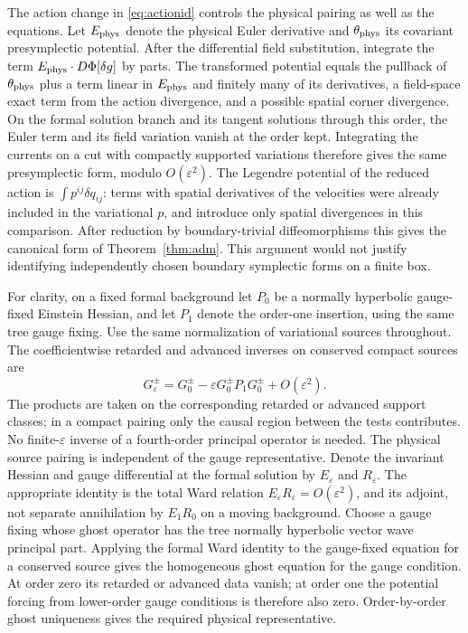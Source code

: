 \documentclass[11pt]{article}
\newcommand{\eps}{\varepsilon}
\begin{document}
The action change in \eqref{eq:actionid} controls the physical pairing as well as the equations. Let \(E_{\rm phys}\) denote the physical Euler derivative and \(\theta_{\rm phys}\) its covariant presymplectic potential. After the differential field substitution, integrate the term \(E_{\rm phys}\cdot D\Phi[\delta g]\) by parts. The transformed potential equals the pullback of \(\theta_{\rm phys}\) plus a term linear in \(E_{\rm phys}\) and finitely many of its derivatives, a field-space exact term from the action divergence, and a possible spatial corner divergence. On the formal solution branch and its tangent solutions through this order, the Euler term and its field variation vanish at the order kept. Integrating the currents on a cut with compactly supported variations therefore gives the same presymplectic form, modulo \(O(\eps^2)\). The Legendre potential of the reduced action is \(\int p^{ij}\delta q_{ij}\): terms with spatial derivatives of the velocities were already included in the variational \(p\), and introduce only spatial divergences in this comparison. After reduction by boundary-trivial diffeomorphisms this gives the canonical form of Theorem~\ref{thm:adm}. This argument would not justify identifying independently chosen boundary symplectic forms on a finite box.

For clarity, on a fixed formal background let \(P_0\) be a normally hyperbolic gauge-fixed Einstein Hessian, and let \(P_1\) denote the order-one insertion, using the same tree gauge fixing. Use the same normalization of variational sources throughout. The coefficientwise retarded and advanced inverses on conserved compact sources are
\begin{equation}
 G^\pm_\eps=G^\pm_0-\eps G^\pm_0P_1G^\pm_0+O(\eps^2).
 \label{eq:born}
\end{equation}
The products are taken on the corresponding retarded or advanced support classes; in a compact pairing only the causal region between the tests contributes. No finite-\(\eps\) inverse of a fourth-order principal operator is needed. The physical source pairing is independent of the gauge representative. Denote the invariant Hessian and gauge differential at the formal solution by \(E_\eps\) and \(R_\eps\). The appropriate identity is the total Ward relation \(E_\eps R_\eps=O(\eps^2)\), and its adjoint, not separate annihilation by \(E_1R_0\) on a moving background. Choose a gauge fixing whose ghost operator has the tree normally hyperbolic vector wave principal part. Applying the formal Ward identity to the gauge-fixed equation for a conserved source gives the homogeneous ghost equation for the gauge condition. At order zero its retarded or advanced data vanish; at order one the potential forcing from lower-order gauge conditions is therefore also zero. Order-by-order ghost uniqueness gives the required physical representative.
\end{document}
